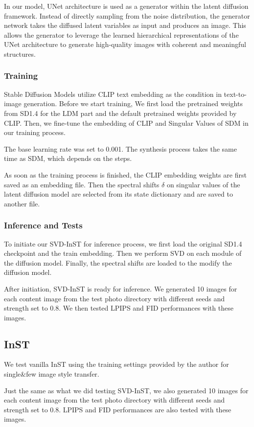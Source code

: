 \documentclass[conference]{IEEEtran}
\begin{document}
In our model, UNet architecture is used as a generator within the latent diffusion framework. Instead of directly sampling from the noise distribution, the generator network takes the diffused latent variables as input and produces an image. This allows the generator to leverage the learned hierarchical representations of the UNet architecture to generate high-quality images with coherent and meaningful structures.

\subsubsection{Training}
Stable Diffusion Models utilize CLIP text embedding as the condition in text-to-image generation. Before we start training, We first load the pretrained weights from SD1.4 for the LDM part and the default pretrained weights provided by CLIP. Then, we fine-tune the embedding of CLIP and Singular Values of SDM in our training process.

The base learning rate was set to 0.001. The synthesis process takes the same time as SDM, which depends on the steps. 

As soon as the training process is finished, the CLIP embedding weights are first saved as an embedding file. Then the spectral shifts $\delta$ on singular values of the latent diffusion model are selected from its state dictionary and are saved to another file.
\subsubsection{Inference and Tests}
To initiate our SVD-InST for inference process, we first load the original SD1.4 checkpoint and the train embedding. Then we perform SVD on each module of the diffusion model. Finally, the spectral shifts are loaded to the modify the diffusion model.

After initiation, SVD-InST is ready for inference. We generated 10 images for each content image from the test photo directory with different seeds and strength set to 0.8. We then tested LPIPS and FID performances with these images.

\subsection{InST}
We test vanilla InST using the training settings provided by the author for single&few image style transfer.

Just the same as what we did testing SVD-InST, we also generated 10 images for each content image from the test photo directory with different seeds and strength set to 0.8. LPIPS and FID performances are also tested with these images.
\end{document}
